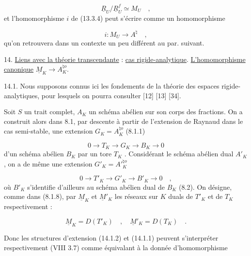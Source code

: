 
\begin{equation}\tag{13.5.12}
\underline{R}_U/\underline{R}^{f}_{U} \simeq M_U \quad ,
\end{equation}
et l'homomorphisme $i$ de (13.3.4) peut s'écrire comme un homomorphisme

\begin{equation}\tag{13.5.13}
i : M_U \longrightarrow A^{\natural} \quad ,
\end{equation}
qu'on retrouvera dans un contexte un peu différent au par. suivant.


14. \underline{Liens avec la théorie transcendante} : \underline{cas rigide-analytique}. \underline{L'homomorphisme canonique} $\underline{M}_K \longrightarrow A_K^{\natural o}$.

14.1. Nous supposons connus ici les fondements de la théorie des espaces rigide-analytiques, pour lesquels on pourra consulter [12] [13] [34].

Soit $S$ un trait complet, $A_K$ un schéma abélien sur son corps des fractions. On a construit alors dans 8.1, par descente à partir de l'extension de Raynaud dans le cas semi-stable, une extension $G_K = A_K^{\natural o}$ (8.1.1)

\begin{equation}\tag{14.1.1}
0 \longrightarrow T_K \longrightarrow G_K \longrightarrow B_K \longrightarrow 0
\end{equation}
d'un schéma abélien $B_K$ par un tore $T_K$ . Considérant le schéma abélien dual $A'_K$ , on a de même une extension $G'_K = A'{}^{\natural o}_{K}$

\begin{equation}\tag{14.1.2}
0 \longrightarrow T'_K \longrightarrow G'_K \longrightarrow B'_K \longrightarrow 0 \quad ,
\end{equation}
où $B'_K$ s'identifie d'ailleurs au schéma abélien dual de $B_K$ (8.2). On désigne, comme dans (8.1.8), par $\underline{M}_K$ et $\underline{M}'_K$ les réseaux sur $K$ duals de $T'_K$ et de $T_K$ respectivement :

\begin{equation}\tag{14.1.3}
\underline{M}_K = D(T'_K) \quad , \quad \underline{M}'_K = D(T_K) \quad .
\end{equation}


Donc les structures d'extension (14.1.2) et (14.1.1) peuvent s'interpréter respectivement (VIII 3.7) comme équivalant à la donnée d'homomorphisme

